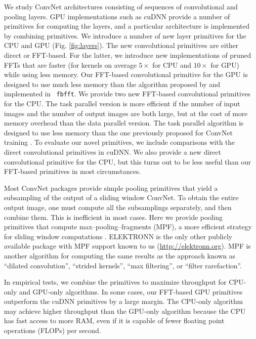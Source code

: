 \documentclass[conference]{./IEEEtran/IEEEtran}
\begin{document}
We study ConvNet architectures consisting of sequences of
convolutional and pooling layers.  GPU implementations such as cuDNN
provide a number of primitives for computing the layers, and a
particular architecture is implemented by combining primitives.  We
introduce a number of new layer primitives for the CPU and GPU
(Fig. \ref{fig:layers}). The new convolutional primitives are either
direct or FFT-based.  For the latter, we introduce new implementations
of pruned FFTs that are faster (for kernels on average $5\times$ for
CPU and $10\times$ for GPU) while using less memory.  Our FFT-based
convolutional primitive for the GPU is designed to use much less
memory than the algorithm proposed
by \cite{mathieu-iclr-14,vasilache2014fast} and implemented in {\tt
fbfft}.  We provide two new FFT-based convolutional primitives for the
CPU. The task parallel version is more efficient if the number of
input images and the number of output images are both large, but at
the cost of more memory overhead than the data parallel version.  The
task parallel algorithm is designed to use less memory than the one
previously proposed for ConvNet training \cite{zlateski2015znn}.  To
evaluate our novel primitives, we include comparisons with the direct
convolutional primitives in cuDNN.  We also provide a new direct
convolutional primitive for the CPU, but this turns out to be less
useful than our FFT-based primitives in most circumstances.

Most ConvNet packages provide simple pooling primitives that yield a
subsampling of the output of a sliding window ConvNet.  To obtain the
entire output image, one must compute all the subsamplings separately,
and then combine them.  This is inefficient in most cases.  Here we
provide pooling primitives that compute max--pooling--fragments (MPF),
a more efficient strategy for sliding window
computations \cite{giusti2013fast, masci2013fast}.  ELEKTRONN is the
only other publicly available package with MPF support known to us
(\url{http://elektronn.org}).  MPF is another algorithm for computing
the same results as the approach known as ``dilated
convolution''\cite{yu2015multi}, ``strided
kernels''\cite{tschopp2015efficient}, ``max
filtering''\cite{zlateski2015znn}, or ``filter
rarefaction''\cite{long2015fully}.

In empirical tests, we combine the primitives to maximize throughput
for CPU-only and GPU-only algorithms. In some cases, our FFT-based
GPU primitives outperform the cuDNN primitives by a large margin.  The
CPU-only algorithm may achieve higher throughput than the GPU-only
algorithm because the CPU has fast access to more RAM, even if it is
capable of fewer floating point operations (FLOPs) per second.
\end{document}
